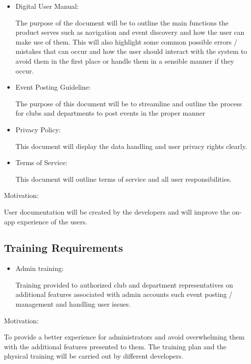 \documentclass[12pt]{article}
\begin{document}
\begin{itemize}

\item Digital User Manual:

The purpose of the document will be to outline the main functions the product serves such as navigation and event discovery and how the user can make use of them. This will also highlight some common possible errors / mistakes that can occur and how the user should interact with the system to avoid them in the first place or handle them in a sensible manner if they occur.

 

\item Event Posting Guideline:

The purpose of this document will be to streamline and outline the process for clubs and departments to post events in the proper manner

\item Privacy Policy:

This document will display the data handling and user privacy rights clearly.

 

\item Terms of Service:

This document will outline terms of service and all user responsibilities.

\end{itemize}
Motivation:

User documentation will be created by the developers and will improve the on-app experience of the users.


\subsection{Training Requirements}

\begin{itemize}
\item Admin training: 

Training provided to authorized club and department representatives on additional features associated with admin accounts such event posting / management and handling user issues.
\end{itemize}
Motivation: 

To provide a better experience for administrators and avoid overwhelming them with the additional features presented to them. The training plan and the physical training will be carried out by different developers.
\end{document}
